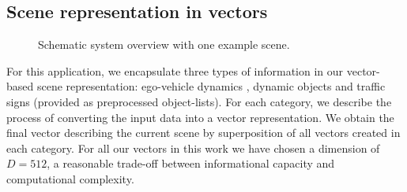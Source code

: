 \subsection{Scene representation in vectors}
\begin{figure}[t!]
	\centering
	\caption{Schematic system overview with one example scene.}\label{fig:sys}
\end{figure}
For this application, we encapsulate three types of information in our vector-based scene representation: ego-vehicle dynamics , dynamic objects and traffic signs (provided as preprocessed object-lists).
For each category, we describe the process of converting the input data into a vector representation.
We obtain the final vector describing the current scene by superposition of all vectors created in each category.
For all our vectors in this work we have chosen a dimension of $D=512$, a reasonable trade-off between informational capacity and computational complexity.\\
